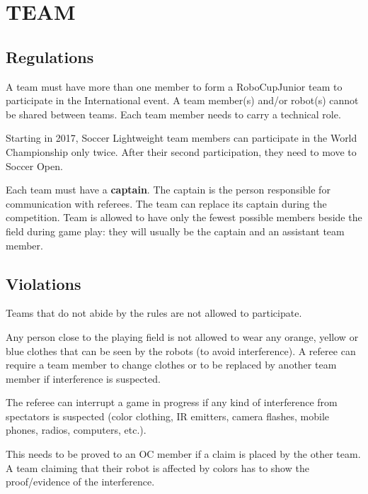 \documentclass{article}
\begin{document}
\textbf{}

\section{TEAM \label{ref-015}}

\subsection{ Regulations \label{ref-016}}

A team must have more than one member to form a RoboCupJunior team to participate in the International event. A team member(s) and/or robot(s) cannot be shared between teams.
Each team member needs to carry a technical role.

Starting in 2017, Soccer Lightweight team members can participate in the World Championship only twice. After their second participation, they need to move to Soccer Open.

Each team must have a \textbf{captain}. The captain is the person responsible for communication with referees. The team can replace its captain during the competition. Team is allowed to have only the fewest possible members beside the field during game play: they will usually be the captain and an assistant team member.

\subsection{ Violations \label{ref-017}}

Teams that do not abide by the rules are not allowed to participate.



Any person close to the playing field is not allowed to wear any orange, yellow or blue clothes that can be seen by the robots (to avoid interference). A referee can require a team member to change clothes or to be replaced by another team member if interference is suspected.

The referee can interrupt a game in progress if any kind of interference from spectators is suspected (color clothing, IR emitters, camera flashes, mobile phones, radios, computers, etc.).

This needs to be proved to an OC member if a claim is placed by the other team. A team claiming that their robot is affected by colors has to show the proof/evidence of the interference.
\end{document}
